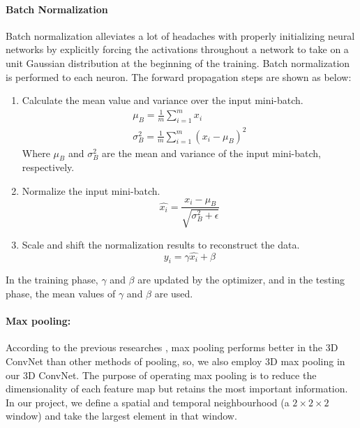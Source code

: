 \paragraph*{Batch Normalization}
\label{bn}
Batch normalization alleviates a lot of headaches with properly initializing neural networks by explicitly forcing the activations throughout a network to take on a unit Gaussian distribution at the beginning of the training. Batch normalization is performed to each neuron. The forward propagation steps are shown as below:
\begin{enumerate}
	\item Calculate the mean value and variance over the input mini-batch.
	\begin{eqnarray}
		\mu_B = \frac{1}{m} \sum_{i=1}^m x_i \\
		\sigma_B^2 = \frac{1}{m} \sum_{i=1}^m (x_i - \mu_B)^2
	\end{eqnarray}
	Where \(\mu_B\) and \(\sigma_B^2\) are the mean and variance of the input mini-batch, respectively.
	
	\item Normalize the input mini-batch.
	\begin{equation}
		\hat{x_i} = \frac{x_i - \mu_B}{\sqrt{\sigma_B^2 + \epsilon}}
	\end{equation}
	
	\item Scale and shift the normalization results to reconstruct the data.
	\begin{equation}
		y_i = \gamma \hat{x_i} + \beta
	\end{equation}
\end{enumerate}
In the training phase, \(\gamma\) and \(\beta\) are updated by the optimizer, and in the testing phase, the mean values of \(\gamma\) and \(\beta\) are used.


\paragraph*{Max pooling:}
\label{pooling}
According to the previous researches \cite{Tran2015} \cite{3dcnn_1}, max pooling performs better in the 3D ConvNet than other methods of pooling, so, we also employ 3D max pooling in our 3D ConvNet. The purpose of operating max pooling is to reduce the dimensionality of each feature map but retains the most important information. In our project, we define a spatial and temporal neighbourhood (a \(2 \times 2 \times 2\) window) and take the largest element in that window. 


